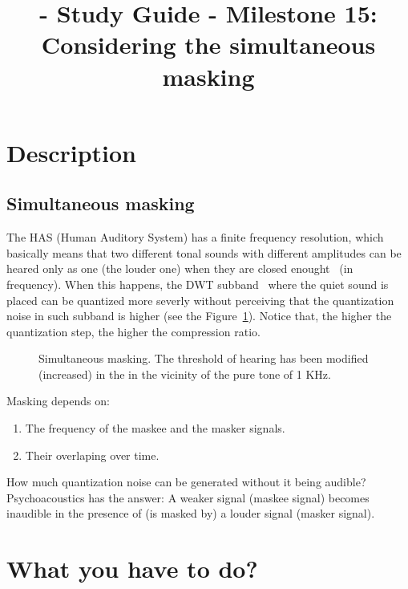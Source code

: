 

\title{\TM{} - Study Guide - Milestone 15: Considering the simultaneous masking}

\maketitle

\section{Description}

\subsection{Simultaneous masking}
The HAS (Human Auditory System) has a finite frequency resolution,
which basically means that two different tonal sounds with different
amplitudes can be heared only as one (the louder one) when they are
closed enought~\cite{bosi2003intro} (in frequency). When this happens,
the DWT subband~\cite{vetterli1995wavelets} where the quiet sound is
placed can be quantized more severly without perceiving that the
quantization noise in such subband is higher (see the
Figure~\ref{fig:SM}). Notice that, the higher the quantization step,
the higher the compression ratio.

\begin{figure}
  \centering
  \caption{Simultaneous masking. The threshold of hearing has been modified (increased) in the in the vicinity of the pure tone of 1 KHz.}
  \label{fig:SM}
\end{figure}

Masking depends on:
\begin{enumerate}
\item The frequency of the maskee and the masker signals.
\item Their overlaping over time.
\end{enumerate}

How much quantization noise can be generated without it being audible?
Psychoacoustics has the answer: A weaker signal (maskee signal) becomes
inaudible in the presence of (is masked by) a louder signal (masker signal). 

\section{What you have to do?}

